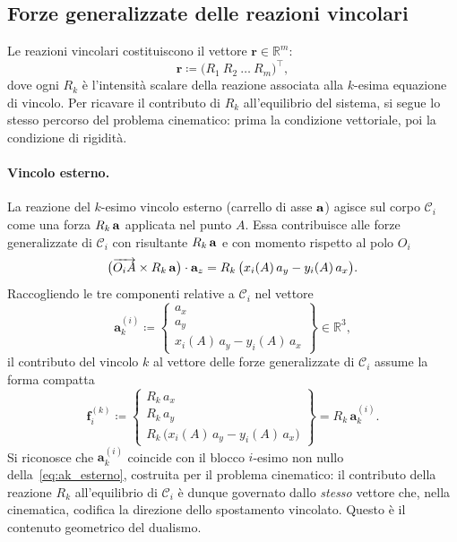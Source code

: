 \subsection{Forze generalizzate delle reazioni vincolari}
\label{sec:rea_eq}

Le reazioni vincolari costituiscono il vettore
$\bm{r} \in \mathbb{R}^{m}$:
\begin{equation}
	\bm{r} \coloneqq
	\bigl(R_1\ R_2 \ \dots\ R_m\bigr)^{\!\top},
\end{equation}
dove ogni $R_k$ è l'intensità scalare della reazione associata
alla $k$-esima equazione di vincolo. Per ricavare il contributo
di $R_k$ all'equilibrio del sistema, si segue lo stesso
percorso del problema cinematico: prima la condizione
vettoriale, poi la condizione di rigidità.


\paragraph{Vincolo esterno.}
La reazione del $k$-esimo vincolo esterno (carrello di asse
$\mathbf{a}$) agisce sul corpo $\mathcal{C}_i$ come una forza
$R_k\,\mathbf{a}$ applicata nel punto $A$. Essa contribuisce alle
forze generalizzate di $\mathcal{C}_i$ con risultante
$R_k\,\mathbf{a}$ e con momento rispetto al polo $O_i$
\begin{equation*}
	\bigl(\overrightarrow{O_i A} \times R_k\,\mathbf{a}\bigr)
	\cdot\mathbf{a}_z
	= R_k\,\bigl(x_i(A)\,a_y - y_i(A)\,a_x\bigr).
\end{equation*}
Raccogliendo le tre componenti relative a $\mathcal{C}_i$
nel vettore
\begin{equation}\label{eq:aki_def}
	\bm{a}_k^{(i)} \coloneqq
	\begin{Bmatrix}
		a_x \\[3pt] a_y \\[3pt]
		x_i(A)\,a_y - y_i(A)\,a_x
	\end{Bmatrix}
	\in \mathbb{R}^3,
\end{equation}
il contributo del vincolo $k$ al vettore delle forze
generalizzate di $\mathcal{C}_i$ assume la forma compatta
\begin{equation}\label{eq:contrib_rea_vett}
	\bm{f}_i^{(k)} \coloneqq
	\begin{Bmatrix}
		R_k\,a_x \\[3pt]
		R_k\,a_y \\[3pt]
		R_k\,\bigl(x_i(A)\,a_y - y_i(A)\,a_x\bigr)
	\end{Bmatrix}
	= R_k\,\bm{a}_k^{(i)}.
\end{equation}
Si riconosce che $\bm{a}_k^{(i)}$ coincide con il blocco
$i$-esimo non nullo della~\eqref{eq:ak_esterno}, costruita
per il problema cinematico: il contributo della reazione
$R_k$ all'equilibrio di $\mathcal{C}_i$ è dunque governato
dallo \emph{stesso} vettore che, nella cinematica, codifica
la direzione dello spostamento vincolato. Questo è il
contenuto geometrico del dualismo.


